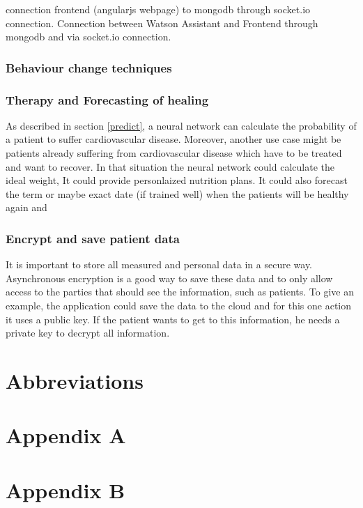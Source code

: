 connection frontend (angularjs webpage) to mongodb through socket.io connection.
Connection between Watson Assistant and Frontend through mongodb and via socket.io connection.
\subsection{Behaviour change techniques}
\subsection{Therapy and Forecasting of healing}
As described in section \ref{predict}, a neural network can calculate the probability of a patient to suffer cardiovascular disease.
Moreover, another use case might be patients already suffering from cardiovascular disease which have to be treated and want to recover. In that situation the neural network could calculate the ideal weight,
It could provide personlaized nutrition plans. It could also forecast the term or maybe exact date (if trained well) when the patients will be healthy again and  

\subsection{Encrypt and save patient data}

It is important to store all measured and personal data in a secure way. Asynchronous encryption is a good way to save these data and to only allow access to the parties that should see the information, such as patients. To give an example, the application could save the data to the cloud and for this one action it uses a public key. If the patient wants to get to this information, he needs a private key to decrypt all information. 





\chapter{Abbreviations}


\printbibliography[heading=bibintoc]

\chapter{Appendix A}\label{appendix a}

\chapter{Appendix B}\label{appendix b}



